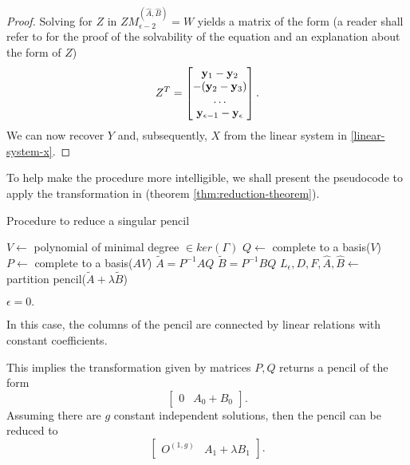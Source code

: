 \begin{cs}
\begin{proof}
        Solving for \(Z\) in \(ZM_{\epsilon-2}^{(\widehat{A}, \widehat{B})} = W\) yields a matrix of the form
        (a reader shall refer to \cite[p.34]{gantmacher} for the proof of the solvability of the equation and 
        an explanation about the form of \(Z\))
        \[
            Z^T =
            \begin{bmatrix}
                \vb{y}_{1} - \vb{y}_{2} \\
                - (\vb{y}_{2} - \vb{y}_{3}) \\
                \hdots \\
                \vb{y}_{\epsilon-1} - \vb{y}_{\epsilon}
            \end{bmatrix}.
        \]
        We can now recover \(Y\) and, subsequently, \(X\) from the linear system in \eqref{linear-system-x}.
    \end{proof}

    To help make the procedure more intelligible, we shall present the pseudocode to apply the transformation in
     (theorem \ref{thm:reduction-theorem}).

    \pagebreak
    \begin{algorithm}[!h]\label{alg:kcf-singular}
        \caption{Procedure to reduce a singular pencil}
        $V \gets $ polynomial of minimal degree $\in ker(\Gamma)$\;
        $Q \gets $ complete to a basis($V$)\;
        $P \gets $ complete to a basis($AV$)\;
        $\tilde{A} = P^{-1}AQ$\;
        $\tilde{B} = P^{-1}BQ$\;
        $L_{\epsilon}, D, F, \widehat{A}, \widehat{B} \gets $ partition pencil($\tilde{A} + \lambda \tilde{B}$)\;
        {\;}
    \end{algorithm}
    \case \(\epsilon = 0.\)

    In this case, the columns of the pencil are connected by linear relations with constant coefficients.

    This implies the transformation given by matrices \(P, Q\) returns a pencil of the form
    \[
        \begin{bmatrix}
            0 & A_{0} + B_{0}
        \end{bmatrix}.
    \]
    Assuming there are \(g\) constant independent solutions, then the pencil can be reduced to
    \[
        \begin{bmatrix}
            O^{(1, g)} & A_1 + \lambda B_1
        \end{bmatrix}.
    \]


\end{cs}

